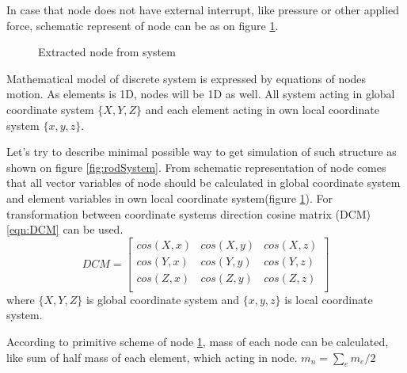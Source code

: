 In case that node does not have external interrupt, like pressure or other applied force, schematic
 represent of node can be as on figure \ref{fig:nodeExtract}.\par
\begin{figure}[ht]
  \centering
      
  \caption{Extracted node from system}\label{fig:nodeExtract}
\end{figure}
Mathematical model of discrete system is expressed by equations of nodes motion. As elements is 1D,
nodes will be 1D as well. All system acting in global coordinate system $\{X, Y, Z\}$ and each
element acting in own local coordinate system $\{x,y,z\}$.
\par
Let's try to describe minimal possible way to get simulation of such structure as shown on figure
 \ref{fig:rodSystem}. From schematic representation of node comes that all vector variables of node
 should be calculated in global coordinate system and element variables in own local coordinate
 system(figure \ref{fig:nodeExtract}). For transformation between coordinate systems direction
 cosine matrix (DCM)\eqref{eqn:DCM} can be used.
\begin{equation}\label{eqn:DCM}
  DCM= \begin{bmatrix}
    cos(X,x)&cos(X,y)&cos(X,z)\\
    cos(Y,x)&cos(Y,y)&cos(Y,z)\\
    cos(Z,x)&cos(Z,y)&cos(Z,z)\\
   \end{bmatrix} 
\end{equation}
where $\{X, Y, Z\}$ is global coordinate system and $\{x,y,z\}$ is local coordinate
system.\par According to primitive scheme of node \ref{fig:nodeExtract}, mass of
each node can be calculated, like sum of half mass of each element, which acting
in node. $m_n=\sum_{e}m_e/2$\par
